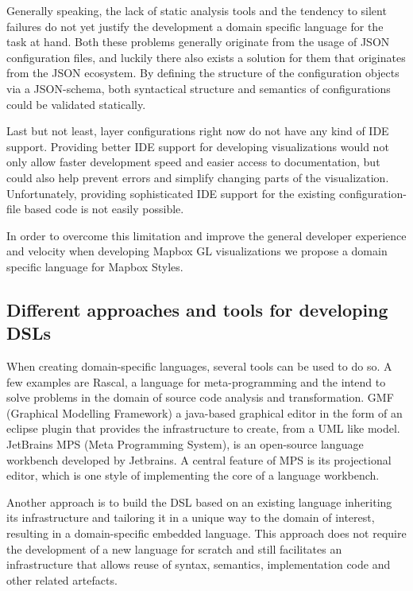 \documentclass[conference]{IEEEtran}
\begin{document}
Generally speaking, the lack of static analysis tools and the tendency to silent failures do not yet justify the development a domain specific language for the task at hand. Both these problems generally originate from the usage of JSON configuration files, and luckily there also exists a solution for them that originates from the JSON ecosystem. By defining the structure of the configuration objects via a JSON-schema, both syntactical structure and semantics of configurations could be validated statically\cite{pezoa2016json}.

Last but not least, layer configurations right now do not have any kind of IDE support. Providing better IDE support for developing visualizations would not only allow faster development speed and easier access to documentation, but could also help prevent errors and simplify changing parts of the visualization. Unfortunately, providing sophisticated IDE support for the existing configuration-file based code is not easily possible. 

In order to overcome this limitation and improve the general developer experience and velocity when developing Mapbox GL visualizations we propose a domain specific language for Mapbox Styles.


\subsection{Different approaches and tools for developing DSLs}
When creating domain-specific languages, several tools can be used to do so. A few examples are Rascal, a  language for meta-programming and the intend to solve problems in the domain of source code analysis and transformation\cite{klint2009easy}.
GMF (Graphical Modelling Framework) a java-based graphical editor in the form of an eclipse plugin that provides the infrastructure to create, from a UML like model\cite{james2011designing}.
JetBrains MPS (Meta Programming System), is an open-source language workbench developed by Jetbrains. A central feature of MPS is its projectional editor, which is one style of implementing the core of a language workbench\cite{voelter2019lessons}.

Another approach is to build the DSL based on an existing language inheriting its infrastructure and tailoring it in a unique way to the domain of interest, resulting in a domain-specific embedded language. This approach does not require the development of a new language for scratch and still facilitates an infrastructure that allows reuse of syntax, semantics, implementation code and other related artefacts\cite{685738}.
 
\end{document}
